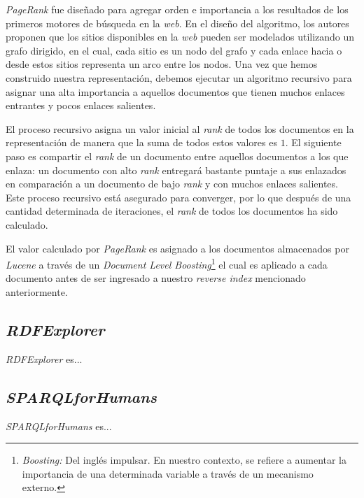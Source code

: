 \textit{PageRank} fue diseñado para agregar orden e importancia a los resultados de los primeros motores de búsqueda en la \textit{web}. En el diseño del algoritmo, los autores proponen que los sitios disponibles en la \textit{web} pueden ser modelados utilizando un grafo dirigido, en el cual, cada sitio es un nodo del grafo y cada enlace hacia o desde estos sitios representa un arco entre los nodos. Una vez que hemos construido nuestra representación, debemos ejecutar un algoritmo recursivo para asignar una alta importancia a aquellos documentos que tienen muchos enlaces entrantes y pocos enlaces salientes.

El proceso recursivo asigna un valor inicial al \textit{rank} de todos los documentos en la representación de manera que la suma de todos estos valores es $1$. El siguiente paso es compartir el \textit{rank} de un documento entre aquellos documentos a los que enlaza: un documento con alto \textit{rank} entregará bastante puntaje a sus enlazados en comparación a un documento de bajo \textit{rank} y con muchos enlaces salientes. Este proceso recursivo está asegurado para converger, por lo que después de una cantidad determinada de iteraciones, el \textit{rank} de todos los documentos ha sido calculado.

El valor calculado por \textit{PageRank} es asignado a los documentos almacenados por \textit{Lucene} a través de un \textit{Document Level Boosting}\footnote{\textit{Boosting:} Del inglés impulsar. En nuestro contexto, se refiere a aumentar la importancia de una determinada variable a través de un mecanismo externo.} el cual es aplicado a cada documento antes de ser ingresado a nuestro \textit{reverse index} mencionado anteriormente.

\subsection{\textit{RDFExplorer}}

\textit{RDFExplorer} es...

\subsection{\textit{SPARQLforHumans}}

\textit{SPARQLforHumans} es...
